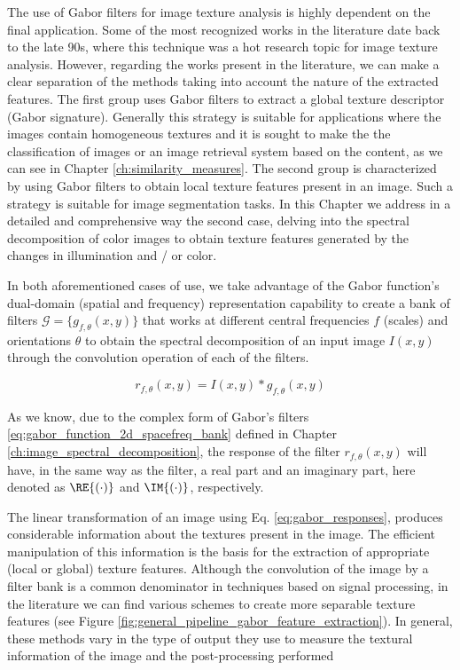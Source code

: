 The use of Gabor filters for image texture analysis is highly dependent on the final application. Some of the most recognized works in the literature date back to the late 90s, where this technique was a hot research topic for image texture analysis. However, regarding the works present in the literature, we can make a clear separation of the methods taking into account the nature of the extracted features. The first group uses Gabor filters to extract a global texture descriptor (Gabor signature). Generally this strategy is suitable for applications where the images contain homogeneous textures and it is sought to make the the classification of images or an image retrieval system based on the content, as we can see in Chapter \ref{ch:similarity_measures}. The second group is characterized by using Gabor filters to obtain local texture features present in an image. Such a strategy is suitable for image segmentation tasks. In this Chapter we address in a detailed and comprehensive way the second case, delving into the spectral decomposition of color images to obtain texture features generated by the changes in illumination and / or color.

In both aforementioned cases of use, we take advantage of the Gabor function's dual-domain (spatial and frequency) representation capability to create a bank of filters $\mathcal{G}=\{g_{f, \theta}(x, y) \}$ that works at different central frequencies $f$ (scales) and orientations $\theta$ to obtain the spectral decomposition of an input image $I(x, y)$ through the convolution operation of each of the filters. 

\begin{equation}\label{eq:gabor_responses}
    r_{f, \theta}(x,y) = I(x, y) \ast g_{f, \theta}(x,y)
\end{equation}

As we know, due to the complex form of Gabor's filters \ref{eq:gabor_function_2d_spacefreq_bank} defined in Chapter \ref{ch:image_spectral_decomposition}, the response of the filter $r_{f,\theta}(x, y)$ will have, in the same way as the filter, a real part and an imaginary part, here denoted as $\RE{(\cdot)}$ and $\IM{(\cdot)}$, respectively.

The linear transformation of an image using Eq. \eqref{eq:gabor_responses}, produces considerable information about the textures present in the image. The efficient manipulation of this information is the basis for the extraction of appropriate (local or global) texture features. Although the convolution of the image by a filter bank is a common denominator in techniques based on signal processing, in the literature we can find various schemes to create more separable texture features (see Figure \ref{fig:general_pipeline_gabor_feature_extraction}). In general, these methods vary in the type of output they use to measure the textural information of the image and the post-processing performed

